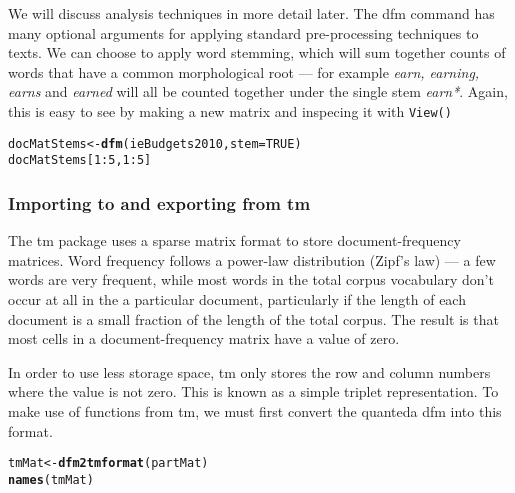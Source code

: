 \documentclass[11pt]{article}\usepackage[]{graphicx}\usepackage[]{color}
\makeatletter
\newcommand{\hlnum}[1]{\textcolor[rgb]{0.686,0.059,0.569}{#1}}%
\newcommand{\hlopt}[1]{\textcolor[rgb]{0,0,0}{#1}}%
\newcommand{\hlstd}[1]{\textcolor[rgb]{0.345,0.345,0.345}{#1}}%
\newcommand{\hlkwb}[1]{\textcolor[rgb]{0.69,0.353,0.396}{#1}}%
\newcommand{\hlkwc}[1]{\textcolor[rgb]{0.333,0.667,0.333}{#1}}%
\newcommand{\hlkwd}[1]{\textcolor[rgb]{0.737,0.353,0.396}{\textbf{#1}}}%
\newenvironment{kframe}{%
 \def\at@end@of@kframe{}%
 \ifinner\ifhmode%
  \def\at@end@of@kframe{\end{minipage}}%
  \begin{minipage}{\columnwidth}%
 \fi\fi%
 \def\FrameCommand##1{\hskip\@totalleftmargin \hskip-\fboxsep
 \colorbox{shadecolor}{##1}\hskip-\fboxsep
     \hskip-\linewidth \hskip-\@totalleftmargin \hskip\columnwidth}%
 \MakeFramed {\advance\hsize-\width
   \@totalleftmargin\z@ \linewidth\hsize
   \@setminipage}}%
 {\par\unskip\endMakeFramed%
 \at@end@of@kframe}
\newenvironment{knitrout}{}{} %
\makeatother
\begin{document}
We will discuss analysis techniques in more detail later. The dfm command has many optional arguments for applying standard pre-processing techniques to texts. We can choose to apply word stemming, which will sum together counts of words that have a common morphological root --- for example \textit{earn, earning, earns} and \textit{earned} will all be counted together under the single stem \textit{earn*}. Again, this is easy to see by making a new matrix and inspecing it with \texttt{View()}

\begin{knitrout}\footnotesize
{}\color{fgcolor}\begin{kframe}
\begin{alltt}
\hlstd{docMatStems} \hlkwb{<-} \hlkwd{dfm}\hlstd{(ieBudgets2010,} \hlkwc{stem} \hlstd{=} \hlnum{TRUE}\hlstd{)}
\hlstd{docMatStems[}\hlnum{1}\hlopt{:}\hlnum{5}\hlstd{,} \hlnum{1}\hlopt{:}\hlnum{5}\hlstd{]}
\end{alltt}
\end{kframe}
\end{knitrout}


\subsubsection{Importing to and exporting from \textsf{tm}}

The \textsf{tm} package uses a sparse matrix format to store document-frequency matrices. Word frequency follows a power-law distribution (Zipf's law) --- a few words are very frequent, while most words in the total corpus vocabulary don't occur at all in the a particular document, particularly if the length of each document is a small fraction of the length of the total corpus.  The result is that most cells in a document-frequency matrix have a value of zero. 

In order to use less storage space, \textsf{tm} only stores the row and column numbers where the value is not zero. This is known as a simple triplet representation. To make use of functions from \textsf{tm}, we must first convert the quanteda dfm into this format. 

\begin{knitrout}\footnotesize
{}\color{fgcolor}\begin{kframe}
\begin{alltt}
\hlstd{tmMat} \hlkwb{<-} \hlkwd{dfm2tmformat}\hlstd{(partMat)}
\hlkwd{names}\hlstd{(tmMat)}
\end{alltt}
\end{kframe}
\end{knitrout}




\end{document}
